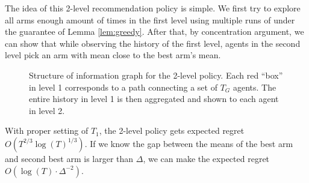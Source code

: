 The idea of this 2-level recommendation policy is simple. We first try to explore all arms enough amount of times in the first level using multiple runs of \ALGG under the guarantee of Lemma \ref{lem:greedy}. After that, by concentration argument, we can show that while observing the history of the first level, agents in the second level pick an arm with mean close to the best arm's mean. 
\fi





\begin{figure}[H]
\centering
{}

\caption{Structure of information graph for the 2-level policy. Each
  red ``box'' in level 1 corresponds to a path connecting a set of
  $T_G$ agents. The entire history in level 1 is then aggregated and
  shown to each agent in level 2.}
\label{fig:2level}
\end{figure}







\begin{theorem}
\label{thm:2level}
With proper setting of $T_1$, the 2-level policy gets expected regret
$O(T^{2/3} \log(T)^{1/3})$. If we know the gap between the means of
the best arm and second best arm is larger than $\Delta$, we can make
the expected regret $O(\log(T) \cdot \Delta^{-2})$.
\end{theorem}

